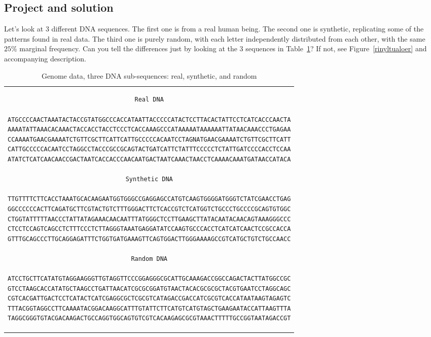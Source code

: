 \documentclass[oneside,10pt]{book}
\begin{document}
\subsection{Project and solution}\label{pscaokesour}

Let's look at 3 different DNA sequences. The first one is from a real human being. The second one is synthetic, replicating some of the patterns found in real data. The third one is purely random, with each letter 
 independently distributed from each other, with the same $25\%$ marginal frequency. Can you tell the differences 
just by looking at the 3 sequences in Table~\ref{tafresa}? If not, see Figure~\ref{rinyltualoer} and accompanying description. 
\vspace{1ex}


\begin{table}
\begin{center}
\begin{tabular}{c}
\begin{lstlisting}[frame=none]
Real DNA

ATGCCCCAACTAAATACTACCGTATGGCCCACCATAATTACCCCCATACTCCTTACACTATTCCTCATCACCCAACTA
AAAATATTAAACACAAACTACCACCTACCTCCCTCACCAAAGCCCATAAAAATAAAAAATTATAACAAACCCTGAGAA
CCAAAATGAACGAAAATCTGTTCGCTTCATTCATTGCCCCCACAATCCTAGNATGAACGAAAATCTGTTCGCTTCATT
CATTGCCCCCACAATCCTAGGCCTACCCGCCGCAGTACTGATCATTCTATTTCCCCCTCTATTGATCCCCACCTCCAA
ATATCTCATCAACAACCGACTAATCACCACCCAACAATGACTAATCAAACTAACCTCAAAACAAATGATAACCATACA

Synthetic DNA

TTGTTTTCTTCACCTAAATGCACAAGAATGGTGGGCCGAGGAGCCATGTCAAGTGGGGATGGGTCTATCGAACCTGAG
GGCCCCCCACTTCAGATGCTTCGTACTGTCTTTGGGACTTCTCACCGTCTCATGGTCTGCCCTGCCCCGCAGTGTGGC
CTGGTATTTTTAACCCTATTATAGAAACAACAATTTATGGGCTCCTTGAAGCTTATACAATACAACAGTAAAGGGCCC
CTCCTCCAGTCAGCCTCTTTCCCTCTTAGGGTAAATGAGGATATCCAAGTGCCCACCTCATCATCAACTCCGCCACCA
GTTTGCAGCCCTTGCAGGAGATTTCTGGTGATGAAAGTTCAGTGGACTTGGGAAAAGCCGTCATGCTGTCTGCCAACC

Random DNA

ATCCTGCTTCATATGTAGGAAGGGTTGTAGGTTCCCGGAGGGCGCATTGCAAAGACCGGCCAGACTACTTATGGCCGC
GTCCTAAGCACCATATGCTAAGCCTGATTAACATCGCGCGGATGTAACTACACGCGCGCTACGTGAATCCTAGGCAGC
CGTCACGATTGACTCCTCATACTCATCGAGGCGCTCGCGTCATAGACCGACCATCGCGTCACCATAATAAGTAGAGTC
TTTACGGTAGGCCTTCAAAATACGGACAAGGCATTTGTATTCTTCATGTCATGTAGCTGAAGAATACCATTAAGTTTA
TAGGCGGGTGTACGACAAGACTGCCAGGTGGCAGTGTCGTCACAAGAGCGCGTAAACTTTTTGCCGGTAATAGACCGT
\end{lstlisting}
\end{tabular}
\caption{\label{tafresa}Genome data, three DNA sub-sequences: real, synthetic, and random}
\end{center}
\end{table}
\vspace{1ex}
\end{document}
